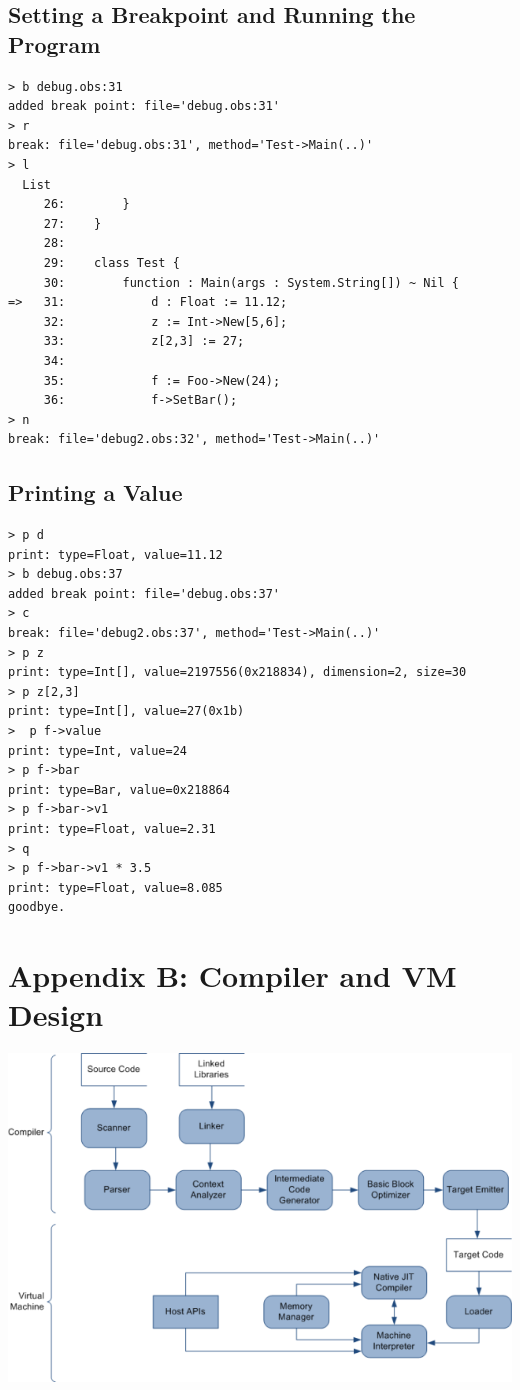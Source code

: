 \documentclass[12pt]{article}
\begin{document}
\subsection{Setting a Breakpoint and Running the Program}
\begin{verbatim}
> b debug.obs:31
added break point: file='debug.obs:31'
> r
break: file='debug.obs:31', method='Test->Main(..)'
> l
  List
     26: 		}
     27: 	}
     28: 
     29: 	class Test {
     30: 		function : Main(args : System.String[]) ~ Nil {
=>   31: 			d : Float := 11.12;
     32: 			z := Int->New[5,6];	
     33: 			z[2,3] := 27;
     34: 
     35: 			f := Foo->New(24);
     36: 			f->SetBar();
> n
break: file='debug2.obs:32', method='Test->Main(..)'
\end{verbatim}

\subsection{Printing a Value}
\begin{verbatim}
> p d
print: type=Float, value=11.12
> b debug.obs:37
added break point: file='debug.obs:37'
> c
break: file='debug2.obs:37', method='Test->Main(..)'
> p z
print: type=Int[], value=2197556(0x218834), dimension=2, size=30
> p z[2,3]
print: type=Int[], value=27(0x1b)
>  p f->value
print: type=Int, value=24
> p f->bar
print: type=Bar, value=0x218864
> p f->bar->v1
print: type=Float, value=2.31
> q
> p f->bar->v1 * 3.5
print: type=Float, value=8.085
goodbye.
\end{verbatim}

\section{Appendix B: Compiler and VM Design}
\includegraphics[scale=0.60]{../../images/compiler_data_flow.png}
\end{document}
